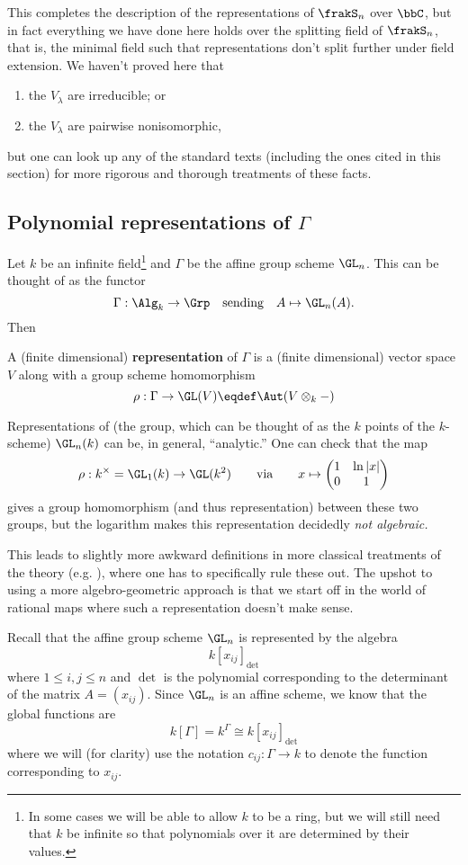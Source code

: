 \documentclass[12pt]{article}
\begin{document}
This completes the description of the representations of $\frakS_n$ over $\bbC$, but in fact everything we have done here holds over the splitting field 
of $\frakS_n$, that is, the minimal field such that representations don't split further under field extension. We haven't proved here that
\begin{enumerate}
	\item the $V_\lambda$ are irreducible; or 
	\item the $V_\lambda$ are pairwise nonisomorphic,
\end{enumerate}
but one can look up any of the standard texts (including the ones cited in this section) for more rigorous and thorough treatments of these facts.

\subsection{Polynomial representations of \texorpdfstring{$\Gamma$}{Gamma}}
Let $k$ be an infinite field\footnote{In some cases we will be able to allow $k$ to be a ring, but we will still need that $k$ be infinite so that 
polynomials over it are determined by their values.} and $\Gamma$ be the affine group scheme $\GL_n$. This can be thought of as the functor 
\[\Gamma:\Alg_k\to \Grp\quad\text{sending}\quad A\mapsto \GL_n(A).\]
Then 
\begin{defn}
	A (finite dimensional) \textbf{representation} of $\Gamma$ is a (finite dimensional) vector space $V$ along with a group scheme homomorphism
	\[\rho:\Gamma\to \GL(V)\eqdef \Aut(V\otimes_k -)\]
\end{defn}
\begin{rmk}
	Representations of (the group, which can be thought of as the $k$ points of the $k$-scheme) $\GL_n(k)$ can be, in general, ``analytic.'' One can check that the map 
	\[\rho:k^\times=\GL_1(k)\to \GL(k^2)\qquad\text{via}\qquad x\mapsto\begin{pmatrix}
		1 & \ln |x|\\ 0 & 1
	\end{pmatrix}\]
	gives a group homomorphism (and thus representation) between these two groups, but the logarithm makes this representation decidedly \textit{not algebraic.}

	This leads to slightly more awkward definitions in more classical treatments of the theory (e.g. \cite{green}), where one has to 
	specifically rule these out. The upshot to using a more algebro-geometric approach is that we start off in the world of rational maps where 
	such a representation doesn't make sense.
\end{rmk}
Recall that the affine group scheme $\GL_n$ is represented by the algebra 
\[k[x_{ij}]_{\det}\]
where $1\le i,j\le n$ and $\det$ is the polynomial corresponding to the determinant of the matrix $A=(x_{ij})$. Since $\GL_n$ is an affine scheme,
we know that the global functions are 
\[k[\Gamma]=k^\Gamma\cong k[x_{ij}]_{\det}\]
where we will (for clarity) use the notation $c_{ij}:\Gamma\to k$ to denote the function corresponding to $x_{ij}$.
\end{document}
